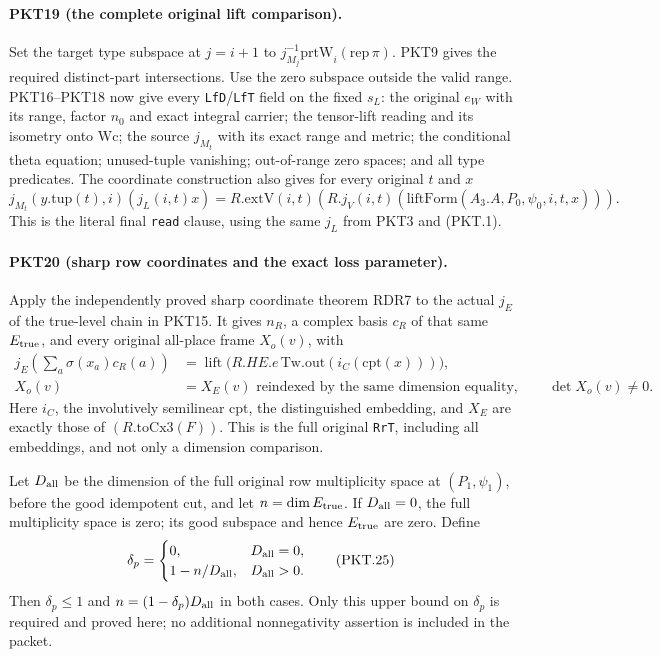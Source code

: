 \paragraph{PKT19 (the complete original lift comparison).}\label{claim:PKT19}
Set the target type subspace at $j=i+1$ to
$j_{M_j}^{-1}\mathrm{prtW}_i(\mathrm{rep}\,\pi)$.  PKT9 gives the
required distinct-part intersections.  Use the zero subspace outside the
valid range.  PKT16--PKT18 now give every \texttt{LfD}/\texttt{LfT}
field on the fixed $s_L$: the original $e_W$ with its range, factor $n_0$
and exact integral carrier; the tensor-lift reading and its isometry onto
$\mathrm{Wc}$; the source $j_{M_t}$ with its exact range and metric; the
conditional theta equation; unused-tuple vanishing; out-of-range zero
spaces; and all type predicates.  The coordinate construction also gives
for every original $t$ and $x$
\[
 j_{M_t}(y.\mathrm{tup}(t),i)(j_L(i,t)x)
       =R.\mathrm{extV}(i,t)
          (R.j_V(i,t)(\mathrm{liftForm}(A_3.A,P_0,\psi_0,i,t,x))).
 \tag{PKT.23}
\]
This is the literal final \texttt{read} clause, using the same $j_L$
from PKT3 and (PKT.1).

\paragraph{PKT20 (sharp row coordinates and the exact loss parameter).}\label{claim:PKT20}
Apply the independently proved sharp coordinate theorem RDR7 to the actual
$j_E$ of the true-level chain in PKT15.  It gives $n_R$, a complex basis
$c_R$ of that same $E_{\rm true}$, and every original all-place frame
$X_o(v)$, with
\[
\begin{split}
 j_E\!\left(\sum_a\sigma(x_a)c_R(a)\right)
 &=\operatorname{lift}\bigl(R.HE.e\,
      \mathrm{Tw.out}(i_C(\mathrm{cpt}(x)))\bigr),\\
 X_o(v)&=X_E(v)\text{ reindexed by the same dimension equality},
 \qquad \det X_o(v)\ne0.
\end{split}\tag{PKT.24}
\]
Here $i_C$, the involutively semilinear $\mathrm{cpt}$, the distinguished
embedding, and $X_E$ are exactly those of $(R.\mathrm{toCx3}(F))$.
This is the full original \texttt{RrT}, including all embeddings, and not
only a dimension comparison.

Let $D_{\rm all}$ be the dimension of the full original row multiplicity
space at $(P_1,\psi_1)$, before the good idempotent cut, and let
$n=\dim E_{\rm true}$.  If $D_{\rm all}=0$, the full multiplicity space
is zero; its good subspace and hence $E_{\rm true}$ are zero.  Define
\[
 \delta_p=\begin{cases}0,&D_{\rm all}=0,\\
                  1-n/D_{\rm all},&D_{\rm all}>0.
          \end{cases}\tag{PKT.25}
\]
Then $\delta_p\le1$ and $n=(1-\delta_p)D_{\rm all}$ in both cases.
Only this upper bound on $\delta_p$ is required and proved here; no
additional nonnegativity assertion is included in the packet.


